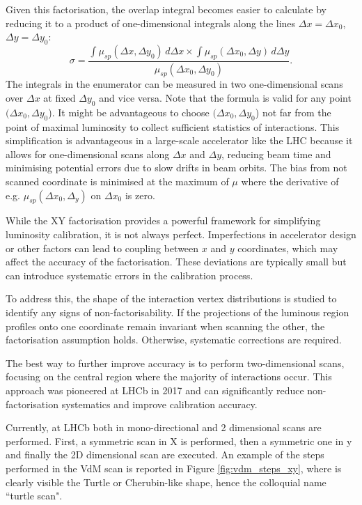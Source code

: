 Given this factorisation, the overlap integral becomes easier to calculate by reducing it to a product of one-dimensional integrals  along the lines $\Delta x = \Delta x_0$, $\Delta y = \Delta y_0$:
\begin{equation}
\sigma = \frac{\int \mu _{sp}(\Delta x, \Delta y_0)\, d\Delta x \times \int \mu _{sp}(\Delta x_0, \Delta y)\, d\Delta y}{\mu _{sp}(\Delta x_0, \Delta y_0)}.\label{definition_sigma_vdm}
\end{equation}
The integrals in the enumerator can be measured in two one-dimensional scans over $\Delta x$ at fixed $\Delta y_0$ and vice versa. Note that the formula is valid for any point $(\Delta x_0, \Delta y_0$). It might be advantageous to choose $(\Delta x_0, \Delta y_0$) not far from the point of maximal luminosity to collect sufficient statistics of interactions. This simplification is advantageous in a large-scale accelerator like the LHC because it allows for one-dimensional scans along \(\Delta x\) and \(\Delta y\), reducing beam time and minimising potential errors due to slow drifts in beam orbits. The bias from not scanned coordinate is minimised at the maximum of $\mu$ where the derivative of e.g. $\mu_{sp}(\Delta x_0, \Delta_y)$ on $\Delta x_0$ is zero.

While the XY factorisation provides a powerful framework for simplifying luminosity calibration, it is not always perfect. Imperfections in accelerator design or other factors can lead to coupling between \(x\) and \(y\) coordinates, which may affect the accuracy of the factorisation. These deviations are typically small but can introduce systematic errors in the calibration process.

To address this, the shape of the interaction vertex distributions is studied to identify any signs of non-factorisability. If the projections of the luminous region profiles onto one coordinate remain invariant when scanning the other, the factorisation assumption holds. Otherwise, systematic corrections are required.

\sloppy The best way to further improve accuracy is to perform two-dimensional scans, focusing on the central region where the majority of interactions occur. This approach was pioneered at LHCb in 2017 and can significantly reduce non-factorisation systematics and improve calibration accuracy\cite{Balagura_2021}.

Currently, at LHCb both in mono-directional and 2 dimensional scans are performed. First, a symmetric scan in X is performed, then a symmetric one in y and finally the 2D dimensional scan are executed. An example of the steps performed in the VdM scan is reported in Figure \ref{fig:vdm_steps_xy}, where is clearly visible the Turtle or Cherubin-like shape, hence the colloquial name ``turtle scan".

